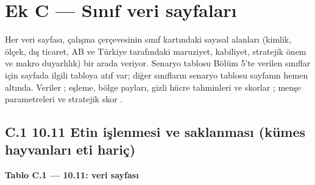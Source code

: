 \hypertarget{nace_kartlar_10-12-ek-c--sux131nux131f-veri-sayfalarux131}{%
\section{Ek C --- Sınıf veri sayfaları}\label{nace_kartlar_10-12-ek-c--sux131nux131f-veri-sayfalarux131}}

Her veri sayfası, çalışma çerçevesinin sınıf kartındaki sayısal alanları (kimlik, ölçek, dış ticaret, AB ve Türkiye tarafındaki maruziyet, kabiliyet, stratejik önem ve makro duyarlılık) bir arada veriyor. Senaryo tablosu Bölüm 5'te verilen sınıflar için sayfada ilgili tabloya atıf var; diğer sınıfların senaryo tablosu sayfanın hemen altında. Veriler \etiketV{}; eşleme, bölge payları, gizli hücre tahminleri ve skorlar \etiketT{}; menşe parametreleri ve stratejik skor \etiketH{}.

\hypertarget{nace_kartlar_10-12-c1-1011-etin-iux15flenmesi-ve-saklanmasux131-kuxfcmes-hayvanlarux131-eti-hariuxe7}{%
\subsection{C.1 10.11 Etin işlenmesi ve saklanması (kümes hayvanları eti hariç)}\label{nace_kartlar_10-12-c1-1011-etin-iux15flenmesi-ve-saklanmasux131-kuxfcmes-hayvanlarux131-eti-hariuxe7}}


\textbf{Tablo C.1 --- 10.11: veri sayfası}

\nopagebreak[4]

\begingroup\gbtablo\small


